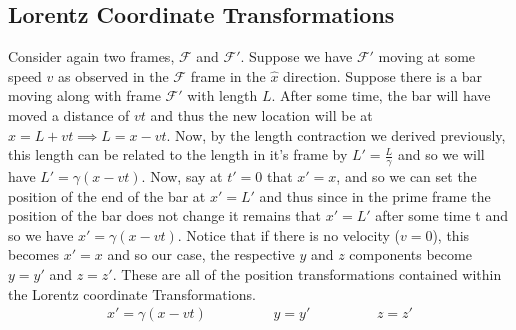 \subsection{Lorentz Coordinate Transformations}

Consider again two frames, $\mathcal{F}$ and $\mathcal{F}'$. Suppose we have $\mathcal{F}'$ moving at some speed $v$ as observed in the $\mathcal{F}$ frame in the $\hat{x}$ direction. Suppose there is a bar moving along with frame $\mathcal{F}'$ with length $L$. After some time, the bar will have moved a distance of $vt$ and thus the new location will be at $x=L+vt \implies L=x-vt$. Now, by the length contraction we derived previously, this length can be related to the length in it's frame by $L'= \frac{L}{\gamma}$ and so we will have $L'=\gamma(x-vt)$. Now, say at $t'=0$ that $x'=x$, and so we can set the position of the end of the bar at $x'=L'$ and thus since in the prime frame the position of the bar does not change it remains that $x'=L'$ after some time t and so we have $x'=\gamma (x-vt)$. Notice that if there is no velocity ($v=0$), this becomes $x'=x$ and so our case, the respective $y$ and $z$ components become $y=y'$ and $z=z'$. These are all of the position transformations contained within the Lorentz coordinate Transformations. 
\begin{align}
	\boxed{x'=\gamma (x-vt) \hspace{2cm} y=y' \hspace{2cm} z=z'} \label{Lorentz Space}
\end{align}

